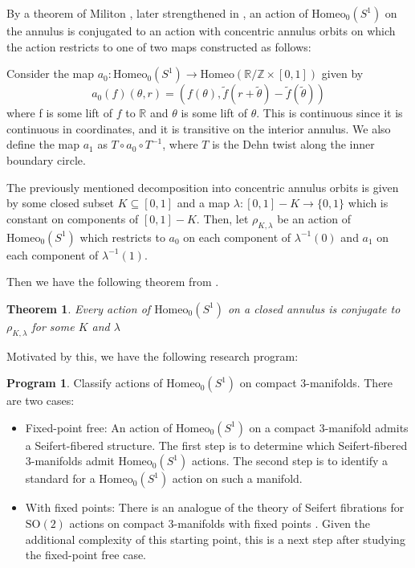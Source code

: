 \documentclass[10pt, oneside]{article}
\newcommand{\R}{\mathbb{R}}
\newcommand{\Z}{\mathbb{Z}}
\newtheorem{thm}{Theorem}
\theoremstyle{definition}
\theoremstyle{definition}
\newtheorem*{prog*}{Program}
\begin{document}
    By a theorem of Militon \cite{militon}, later strengthened in \cite{mann-chen}, an action of $\text{Homeo}_0(S^1)$ on the annulus is conjugated to an action with concentric annulus orbits on which the action restricts to one of two maps constructed as follows:

    Consider the map $a_0:\text{Homeo}_0(S^1)\to \text{Homeo}(\R/\Z \times [0,1])$ given by
    $$a_0(f)(\theta, r) = (f(\theta), \tilde{f}(r + \tilde{\theta}) - \tilde{f}(\tilde{\theta}))$$ where f is some lift of $f$ to $\R$ and $\theta$ is some lift of $\theta$. This is continuous since it is continuous in coordinates, and it is transitive on the interior annulus. We also define the map $a_1$ as $T\circ a_0\circ T^{-1}$, where $T$ is the Dehn twist along the inner boundary circle.
    
    The previously mentioned decomposition into concentric annulus orbits is given by some closed subset $K \subseteq [0,1]$ and a map $\lambda: [0,1]-K \to \{0,1\}$ which is constant on components of $[0,1]-K$. Then, let $\rho_{K, \lambda}$ be an action of $\text{Homeo}_0(S^1)$ which restricts to $a_0$ on each component of $\lambda^{-1}(0)$ and $a_1$ on each component of $\lambda^{-1}(1)$. 

    Then we have the following theorem from \cite{mann-chen}.

    \begin{thm}\label{surface-classif}
        Every action of $\text{Homeo}_0(S^1)$ on a closed annulus is conjugate to $\rho_{K, \lambda}$ for some $K$ and $\lambda$
    \end{thm}

    Motivated by this, we have the following research program:

    \begin{prog*}
        Classify actions of $\text{Homeo}_0(S^1)$ on compact 3-manifolds. There are two cases:
        \begin{itemize}
            \item Fixed-point free: An action of $\text{Homeo}_0(S^1)$ on a compact 3-manifold admits a Seifert-fibered structure. The first step is to determine which Seifert-fibered 3-manifolds admit $\text{Homeo}_0(S^1)$ actions. The second step is to identify a standard for a $\text{Homeo}_0(S^1)$ action on such a manifold.
            \item With fixed points: There is an analogue of the theory of Seifert fibrations for $\text{SO}(2)$ actions on compact 3-manifolds with fixed points \cite{raymond}. Given the additional complexity of this starting point, this is a next step after studying the fixed-point free case.
        \end{itemize}
    \end{prog*}
\end{document}
